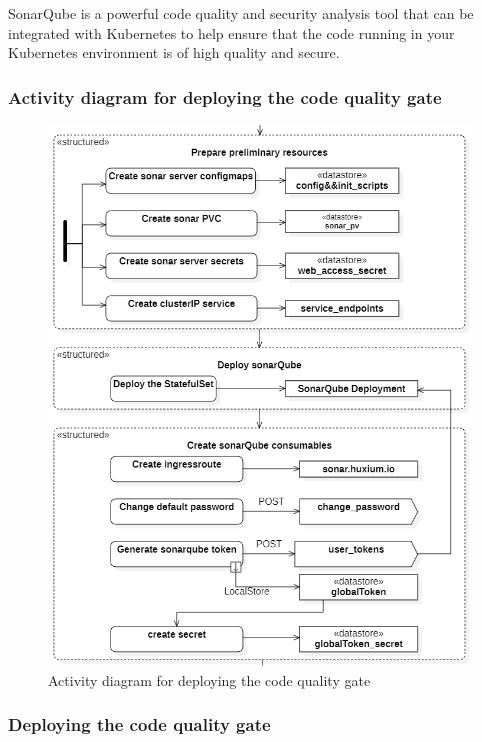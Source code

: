 SonarQube is a powerful code quality and security analysis tool that can be integrated with Kubernetes to help ensure that the code running in your Kubernetes environment is of high quality and secure. 

\subsubsection{Activity diagram for deploying the code quality gate}

\begin{figure}[H]\centering
\includegraphics[width=1.0\textwidth,angle=00]{assets/f41.png}
\caption{Activity diagram for deploying the code quality gate}
\label{fig:Activity diagram for deploying the code quality gate}
\end{figure}

\subsubsection{Deploying the code quality gate }

